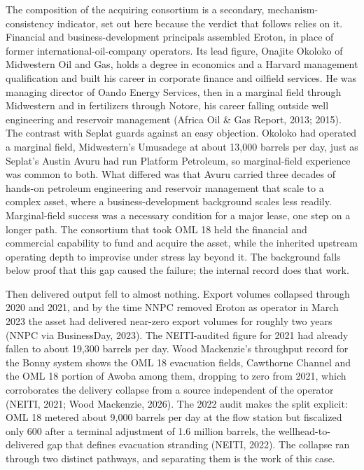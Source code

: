 \documentclass[twoside,fontset=lmodern]{mitthesis}
\begin{document}
The composition of the acquiring consortium is a secondary,
mechanism-consistency indicator, set out here because the verdict that
follows relies on it. Financial and business-development principals
assembled Eroton, in place of former international-oil-company
operators. Its lead figure, Onajite Okoloko of Midwestern Oil and Gas,
holds a degree in economics and a Harvard management qualification and
built his career in corporate finance and oilfield services. He was
managing director of Oando Energy Services, then in a marginal field
through Midwestern and in fertilizers through Notore, his career falling
outside well engineering and reservoir management (Africa Oil \& Gas
Report, 2013; 2015). The contrast with Seplat guards against an easy
objection. Okoloko had operated a marginal field, Midwestern's Umusadege
at about 13,000 barrels per day, just as Seplat's Austin Avuru had run
Platform Petroleum, so marginal-field experience was common to both.
What differed was that Avuru carried three decades of hands-on petroleum
engineering and reservoir management that scale to a complex asset,
where a business-development background scales less readily.
Marginal-field success was a necessary condition for a major lease, one
step on a longer path. The consortium that took OML 18 held the
financial and commercial capability to fund and acquire the asset, while
the inherited upstream operating depth to improvise under stress lay
beyond it. The background falls below proof that this gap caused the
failure; the internal record does that work.

Then delivered output fell to almost nothing. Export volumes collapsed
through 2020 and 2021, and by the time NNPC removed Eroton as operator
in March 2023 the asset had delivered near-zero export volumes for
roughly two years (NNPC via BusinessDay, 2023). The NEITI-audited figure
for 2021 had already fallen to about 19,300 barrels per day. Wood
Mackenzie's throughput record for the Bonny system shows the OML 18
evacuation fields, Cawthorne Channel and the OML 18 portion of Awoba
among them, dropping to zero from 2021, which corroborates the delivery
collapse from a source independent of the operator (NEITI, 2021; Wood
Mackenzie, 2026). The 2022 audit makes the split explicit: OML 18
metered about 9,000 barrels per day at the flow station but fiscalized
only 600 after a terminal adjustment of 1.6 million barrels, the
wellhead-to-delivered gap that defines evacuation stranding (NEITI,
2022). The collapse ran through two distinct pathways, and separating
them is the work of this case.
\end{document}
